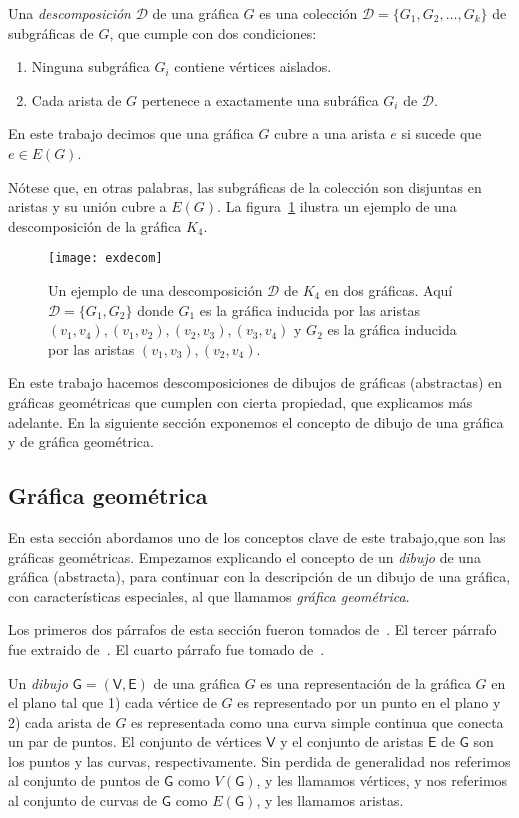 Una \emph{descomposición} $\mathcal{D}$ de una gráfica $G$ es una colección
$\mathcal{D}=\{G_1,G_2,\dots,G_k\}$ de subgráficas de $G$, que cumple con dos
condiciones:
\begin{enumerate}
  \item Ninguna subgráfica $G_i$ contiene vértices aislados.
  \item Cada arista de $G$ pertenece a exactamente una subráfica $G_i$ de
  $\mathcal{D}$.
\end{enumerate}
En este trabajo decimos que una gráfica $G$ cubre a una arista $e$ si sucede
que $e\in E(G)$.

Nótese que, en otras palabras, las subgráficas de la colección son disjuntas en
aristas y su unión cubre a $E(G)$.
La figura~\ref{fig:exdecom} ilustra un ejemplo de una descomposición de la
gráfica $K_4$.
\begin{figure}[htbp]
  \centering
  \texttt{[image: exdecom]}
  \caption{Un ejemplo de una descomposición $\mathcal{D}$ de $K_4$ en dos
  gráficas. Aquí $\mathcal{D}=\{G_1,G_2\}$ donde $G_1$ es la gráfica inducida
  por las aristas $(v_1,v_4),(v_1,v_2),(v_2,v_3),(v_3,v_4)$ y
  $G_2$ es la gráfica inducida por las aristas $(v_1,v_3),(v_2,v_4)$.}
  \label{fig:exdecom}
\end{figure}
%
%

En este trabajo hacemos descomposiciones de dibujos de gráficas (abstractas) en
gráficas geométricas que cumplen con cierta propiedad, que explicamos más
adelante. En la siguiente sección exponemos el concepto de dibujo de una
gráfica y de gráfica geométrica.
\subsection{Gráfica geométrica}
En esta sección abordamos uno de los conceptos clave de este trabajo,que son
las gráficas geométricas. Empezamos explicando el concepto de un
\emph{dibujo} de una gráfica (abstracta), para continuar con la descripción
de un dibujo de una gráfica, con características especiales, al que llamamos
\emph{gráfica geométrica}.

Los primeros dos párrafos de esta sección fueron tomados de~\cite{Pach2013}. El
tercer párrafo fue extraido de~\cite{Lara2019}. El cuarto párrafo fue tomado
de~\cite{Pach2011}.

Un \emph{dibujo} $\mathsf{G}=(\mathsf{V},\mathsf{E})$ de una gráfica $G$ es una
representación de la gráfica $G$ en el plano tal que 1) cada vértice de $G$ es
representado por un punto en el plano y 2) cada arista de $G$ es representada
como una curva simple continua que conecta un par de puntos. El conjunto de
vértices $\mathsf{V}$ y el conjunto de aristas $\mathsf{E}$ de $\mathsf{G}$
son los puntos y las curvas, respectivamente. Sin perdida de generalidad nos
referimos al conjunto de puntos de $\mathsf{G}$ como $V(\mathsf{G})$, y les
llamamos vértices, y nos referimos al conjunto de curvas de $\mathsf{G}$ como
$E(\mathsf{G})$, y les llamamos aristas.

